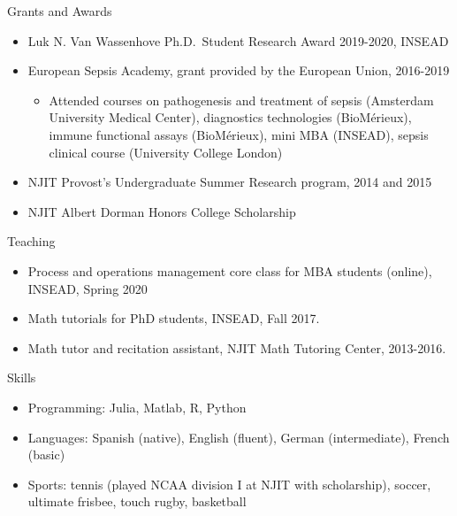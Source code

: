 \documentclass{resume}
\begin{document}
\begin{rSection}{Grants and Awards}

\begin{itemize}
\item Luk N. Van Wassenhove Ph.D.\ Student Research Award 2019-2020, INSEAD
\item European Sepsis Academy, grant provided by the European Union, 2016-2019
\begin{itemize}
  \item Attended courses on pathogenesis and treatment of sepsis (Amsterdam University Medical Center), diagnostics technologies (BioM\'erieux), immune functional assays (BioM\'erieux), mini MBA (INSEAD), sepsis clinical course (University College London)
\end{itemize}
\item NJIT Provost’s Undergraduate Summer Research program, 2014 and 2015
\item NJIT Albert Dorman Honors College Scholarship
\end{itemize}

\begin{rSection}{Teaching}
\begin{itemize}
\item Process and operations management core class for MBA students (online), INSEAD, Spring 2020
\item Math tutorials for PhD students, INSEAD, Fall 2017.
\item Math tutor and recitation assistant, NJIT Math Tutoring Center, 2013-2016.
\end{itemize}

\end{rSection}


\end{rSection}

\begin{rSection}{Skills}
\begin{itemize}
\item Programming: Julia, Matlab, R, Python
\item Languages: Spanish (native), English (fluent), German (intermediate), French (basic)
\item Sports: tennis (played NCAA division I at NJIT with scholarship), soccer, ultimate frisbee, touch rugby, basketball
\end{itemize}

\end{rSection}
 
\end{document}

